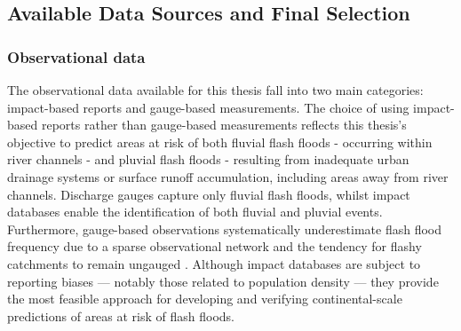 \subsection{Available Data Sources and Final Selection}
\label{integrated_experimental_strategy_data_requirements_final_selection}

\subsubsection{Observational data}

The  observational data available for this thesis fall into two main categories: impact-based reports and gauge-based measurements. The choice of using impact-based reports rather than gauge-based measurements reflects this thesis's objective to predict areas at risk of both fluvial flash floods - occurring within river channels - and pluvial flash floods - resulting from inadequate urban drainage systems or surface runoff accumulation, including areas away from river channels. Discharge gauges capture only fluvial flash floods, whilst impact databases enable the identification of both fluvial and pluvial events. Furthermore, gauge-based observations systematically underestimate flash flood frequency due to a sparse observational network and the tendency for flashy catchments to remain ungauged \citep{Gaume_2009, Gaume_2016}. Although impact databases are subject to reporting biases — notably those related to population density \citep{Marjerison_2016} — they provide the most feasible approach for developing and verifying continental-scale predictions of areas at risk of flash floods.

